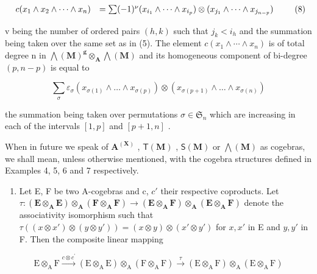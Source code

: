 \[
\begin{array}{r l} c (x _ {1} \wedge x _ {2} \wedge \dots \wedge x _ {n}) & = \sum (- 1) ^ {\nu} (x _ {i _ {1}} \wedge \dots \wedge x _ {i _ {p}}) \otimes (x _ {j _ {1}} \wedge \dots \wedge x _ {j _ {n - p}}) \end{array} \tag {8}
\]

v being the number of ordered pairs \((h, k)\) such that \(j_{k} < i_{h}\) and the summation being taken over the same set as in (5). The element \(c(x_{1} \wedge \cdots \wedge x_{n})\) is of total degree n in \(\bigwedge(\mathbf{M})^{\mathbf{g}} \otimes_{\mathbf{A}} \bigwedge(\mathbf{M})\) and its homogeneous component of bi-degree \((p, n - p)\) is equal to

\[
\sum_ {\sigma} \varepsilon_ {\sigma} (x _ {\sigma (1)} \wedge \dots \wedge x _ {\sigma (p)}) \otimes (x _ {\sigma (p + 1)} \wedge \dots \wedge x _ {\sigma (n)})\tag{9}
\]

the summation being taken over permutations \(\sigma\in\mathfrak{S}_{n}\) which are increasing in each of the intervals \([1,p]\) and \([p+1,n]\) .

When in future we speak of \(\mathbf{A}^{(\mathbf{X})}\) , \(\mathsf{T}(\mathbf{M})\) , \(\mathsf{S}(\mathbf{M})\) or \(\bigwedge (\mathbf{M})\) as cogebras, we shall mean, unless otherwise mentioned, with the cogebra structures defined in Examples 4, 5, 6 and 7 respectively.

\begin{enumerate}
\def\labelenumi{(\arabic{enumi})}
\setcounter{enumi}{7}
\tightlist
\item
  Let E, F be two A-cogebras and c, \(c'\) their respective coproducts. Let \(\tau:(\mathbf{E} \otimes_{\mathbf{A}} \mathbf{E}) \otimes_{\mathbf{A}} (\mathbf{F} \otimes_{\mathbf{A}} \mathbf{F}) \to (\mathbf{E} \otimes_{\mathbf{A}} \mathbf{F}) \otimes_{\mathbf{A}} (\mathbf{E} \otimes_{\mathbf{A}} \mathbf{F})\) denote the associativity isomorphism such that \(\tau((x \otimes x') \otimes (y \otimes y')) = (x \otimes y) \otimes (x' \otimes y')\) for \(x, x'\) in E and \(y, y'\) in F. Then the composite linear mapping
\end{enumerate}

\[
\mathrm{E} \otimes_ {\mathrm{A}} \mathrm{F} \xrightarrow {c \otimes c ^ {\prime}} (\mathrm{E} \otimes_ {\mathrm{A}} \mathrm{E}) \otimes_ {\mathrm{A}} (\mathrm{F} \otimes_ {\mathrm{A}} \mathrm{F}) \xrightarrow {\tau} (\mathrm{E} \otimes_ {\mathrm{A}} \mathrm{F}) \otimes_ {\mathrm{A}} (\mathrm{E} \otimes_ {\mathrm{A}} \mathrm{F})
\]

